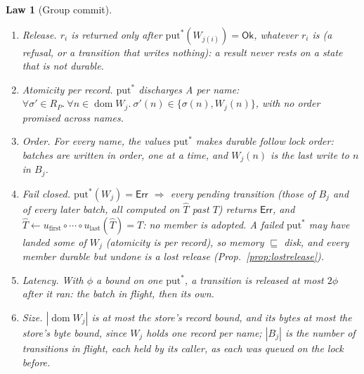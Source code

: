 \documentclass[journal]{IEEEtran}
\newtheorem{law}{Law}
\newcommand{\dom}{\operatorname{dom}}
\newcommand{\Ok}{\mathsf{Ok}}
\newcommand{\Err}{\mathsf{Err}}
\begin{document}
\begin{law}[Group commit]\label{law:group}
\begin{enumerate}[leftmargin=1.5em]
\item \emph{Release.} $r_i$ is returned only after $\mathrm{put}^{*}(W_{j(i)})=\Ok$,
whatever $r_i$ is (a refusal, or a transition that writes nothing): a result never rests on
a state that is not durable.
\item \emph{Atomicity per record.} $\mathrm{put}^{*}$ discharges A per name:
$\forall\sigma'\in R_P.\ \forall n\in\dom W_j.\ \sigma'(n)\in\{\sigma(n),W_j(n)\}$, with no
order promised across names.
\item \emph{Order.} For every name, the values $\mathrm{put}^{*}$ makes durable follow lock
order: batches are written in order, one at a time, and $W_j(n)$ is the last write to $n$
in $B_j$.
\item \emph{Fail closed.} $\mathrm{put}^{*}(W_j)=\Err$ $\Rightarrow$ every pending
transition (those of $B_j$ and of every later batch, all computed on $\hat T$ past $T$)
returns $\Err$, and $\hat T\leftarrow u_{\mathrm{first}}\circ\cdots\circ
u_{\mathrm{last}}(\hat T)=T$: no member is adopted.  A failed $\mathrm{put}^{*}$ may have
landed some of $W_j$ (atomicity is per record), so memory $\sqsubseteq$ disk, and every
member durable but undone is a lost release (Prop.~\ref{prop:lostrelease}).
\item \emph{Latency.} With $\phi$ a bound on one $\mathrm{put}^{*}$, a transition is
released at most $2\phi$ after it ran: the batch in flight, then its own.
\item \emph{Size.} $|\dom W_j|$ is at most the store's record bound, and its bytes at most
the store's byte bound, since $W_j$ holds one record per name; $|B_j|$ is the number of
transitions in flight, each held by its caller, as each was queued on the lock before.
\end{enumerate}
\end{law}
\end{document}
